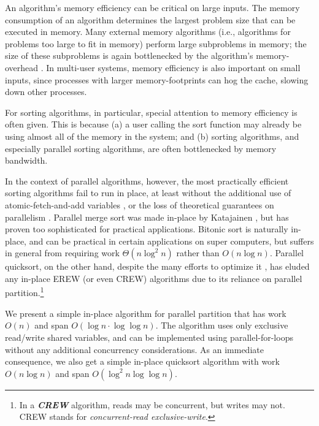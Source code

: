 \documentclass[sigconf]{acmart}
\newcommand{\defn}[1]       {{\textit{\textbf{\boldmath #1}}}}
\renewcommand{\paragraph}[1]{\vspace{0.09in}\noindent{\bf \boldmath #1.}}
\theoremstyle{remark}
\theoremstyle{remark}
\begin{document}
An algorithm's memory efficiency can be critical on large inputs. The
memory consumption of an algorithm determines the largest problem size
that can be executed in memory. Many external memory algorithms (i.e.,
algorithms for problems too large to fit in memory) perform large
subproblems in memory; the size of these subproblems is again
bottlenecked by the algorithm's memory-overhead \cite{Vitter08}. In
multi-user systems, memory efficiency is also important on small
inputs, since processes with larger memory-footprints can hog the
cache, slowing down other processes. 

For sorting algorithms, in particular, special attention to memory
efficiency is often given. This is because (a) a user calling the sort
function may already be using almost all of the memory in the system;
and (b) sorting algorithms, and especially parallel sorting
algorithms, are often bottlenecked by memory bandwidth.

In the context of parallel algorithms, however, the most practically
efficient sorting algorithms fail to run in place, at least without
the additional use of atomic-fetch-and-add variables
\cite{HeidelbergerNo90, AxtmannWi17, TsigasZh03}, or the loss of
theoretical guarantees on parallelism \cite{FrancisPa92}. Parallel
merge sort \cite{Hagerup89} was made in-place by Katajainen
\cite{Katajainen93}, but has proven too sophisticated for practical
applications. Bitonic sort \cite{BlellochLe98} is naturally in-place,
and can be practical in certain applications on super computers, but
suffers in general from requiring work $\Theta(n \log^2 n)$ rather
than $O(n \log n)$. Parallel quicksort, on the other hand, despite the
many efforts to optimize it \cite{HeidelbergerNo90, AxtmannWi17,
  TsigasZh03, FrancisPa92, Frias08}, has eluded any in-place EREW (or
even CREW) algorithms due to its reliance on parallel
partition.\footnote{In a \defn{CREW} algorithm, reads may be
  concurrent, but writes may not. CREW stands for
  \emph{concurrent-read exclusive-write}.}


\paragraph{Results}
We present a simple in-place algorithm for parallel partition that has
work $O(n)$ and span $O(\log n \cdot \log \log n)$. The algorithm uses
only exclusive read/write shared variables, and can be implemented
using parallel-for-loops without any additional concurrency
considerations. As an immediate consequence, we also get a simple
in-place quicksort algorithm with work $O(n \log n)$ and span
$O(\log^2 n \log \log n)$.
\end{document}
